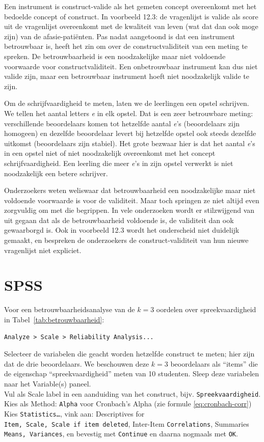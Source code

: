 \documentclass[
]{book}
\begin{document}
Een instrument is construct-valide als het gemeten concept overeenkomt
met het bedoelde concept of construct. In
voorbeeld 12.3: de vragenlijst is valide als score uit de
vragenlijst overeenkomt met de kwaliteit van leven (wat dat dan ook moge
zijn) van de afasie-patiënten. Pas nadat aangetoond is dat een
instrument betrouwbaar is, heeft het zin om over de constructvaliditeit
van een meting te spreken. De betrouwbaarheid is een noodzakelijke maar
niet voldoende voorwaarde voor constructvaliditeit. Een onbetrouwbaar
instrument kan dus niet valide zijn, maar een betrouwbaar instrument
hoeft niet noodzakelijk valide te zijn.

Om de schrijfvaardigheid te meten, laten we de leerlingen een opstel
schrijven. We tellen het aantal letters \emph{e} in elk opstel. Dat is een
zeer betrouwbare meting: verschillende beoordelaars komen tot hetzelfde
aantal \emph{e}'s (beoordelaars zijn homogeen) en dezelfde beoordelaar levert
bij hetzelfde opstel ook steeds dezelfde uitkomst (beoordelaars zijn
stabiel). Het grote bezwaar hier is dat het aantal \emph{e}'s in een opstel
niet of niet noodzakelijk overeenkomt met het concept
schrijfvaardigheid. Een leerling die meer \emph{e}'s in zijn opstel verwerkt
is niet noodzakelijk een betere schrijver.

Onderzoekers weten weliswaar dat betrouwbaarheid een noodzakelijke maar
niet voldoende voorwaarde is voor de validiteit. Maar toch springen ze
niet altijd even zorgvuldig om met die begrippen. In vele onderzoeken
wordt er stilzwijgend van uit gegaan dat als de betrouwbaarheid
voldoende is, de validiteit dan ook gewaarborgd is. Ook in voorbeeld 12.3
wordt het onderscheid niet duidelijk gemaakt,
en bespreken de onderzoekers de construct-validiteit van hun nieuwe
vragenlijst niet expliciet.

\section{SPSS}\label{spss-9}

Voor een betrouwbaarheidsanalyse van de \(k=3\) oordelen over
spreekvaardigheid in
Tabel~\ref{tab:betrouwbaarheid}:\\

\begin{verbatim}
Analyze > Scale > Reliability Analysis...
\end{verbatim}

Selecteer de variabelen die geacht worden hetzelfde construct te meten;
hier zijn dat de drie beoordelaars. We beschouwen deze \(k=3\)
beoordelaars als ``items'' die de eigenschap ``spreekvaardigheid'' meten van
10 studenten. Sleep deze variabelen naar het Variable(s) paneel.\\
Vul als Scale label in een aanduiding van het construct, bijv.
\texttt{Spreekvaardigheid}.\\
Kies als Method: \texttt{Alpha} voor Cronbach's Alpha (zie formule
\eqref{eq:cronbach-corr})\\
Kies \texttt{Statistics…}, vink aan: Descriptives for
\texttt{Item,\ Scale,\ Scale\ if\ item\ deleted}, Inter-Item \texttt{Correlations},
Summaries \texttt{Means,\ Variances}, en bevestig met \texttt{Continue} en daarna
nogmaals met \texttt{OK}.
\end{document}
